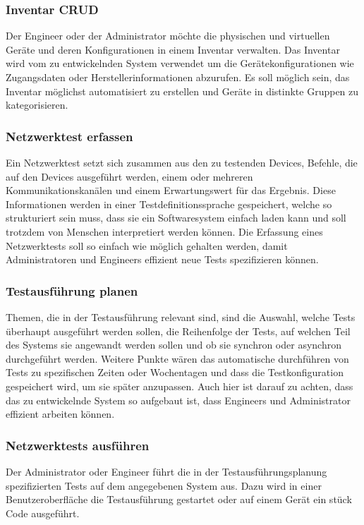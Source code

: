 \documentclass[
	ngerman,
	toc=listof, %
	toc=bibliography, %
	footnotes=multiple, %
	parskip=half, %
	numbers=noendperiod %
]{scrartcl}
\begin{document}
		\subsubsection{Inventar CRUD}
			Der Engineer oder der Administrator möchte die physischen und virtuellen Geräte und deren Konfigurationen in einem Inventar verwalten.
			Das Inventar wird vom zu entwickelnden System verwendet um die Gerätekonfigurationen wie Zugangsdaten oder Herstellerinformationen abzurufen.
			Es soll möglich sein, das Inventar möglichst automatisiert zu erstellen und Geräte in distinkte Gruppen zu kategorisieren.

		\subsubsection{Netzwerktest erfassen}
			Ein Netzwerktest setzt sich zusammen aus den zu testenden Devices, Befehle, die auf den Devices ausgeführt werden, einem oder mehreren Kommunikationskanälen und einem Erwartungswert für das Ergebnis.
			Diese Informationen werden in einer Testdefinitionssprache gespeichert, welche so strukturiert sein muss, dass sie ein Softwaresystem einfach laden kann und soll trotzdem von Menschen interpretiert werden können.
			Die Erfassung eines Netzwerktests soll so einfach wie möglich gehalten werden, damit Administratoren und Engineers effizient neue Tests spezifizieren können.

		\subsubsection{Testausführung planen}
			Themen, die in der Testausführung relevant sind, sind die Auswahl, welche Tests überhaupt ausgeführt werden sollen, die Reihenfolge der Tests, auf welchen Teil des Systems sie angewandt werden sollen und ob sie synchron oder asynchron durchgeführt werden.
			Weitere Punkte wären das automatische durchführen von Tests zu spezifischen Zeiten oder Wochentagen und dass die Testkonfiguration gespeichert wird, um sie später anzupassen.
			Auch hier ist darauf zu achten, dass das zu entwickelnde System so aufgebaut ist, dass Engineers und Administrator effizient arbeiten können.

		\subsubsection{Netzwerktests ausführen}
			Der Administrator oder Engineer führt die in der Testausführungsplanung spezifizierten Tests auf dem angegebenen System aus.
			Dazu wird in einer Benutzeroberfläche die Testausführung gestartet oder auf einem Gerät ein stück Code ausgeführt.
\end{document}
